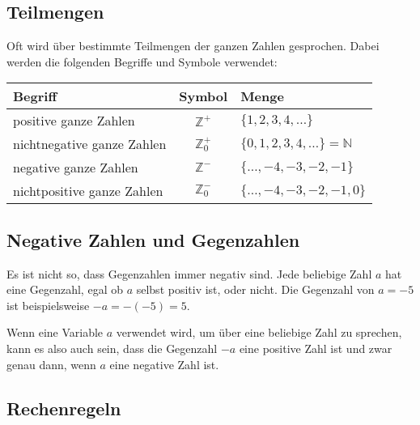 \subsection{Teilmengen}
Oft wird über bestimmte Teilmengen der ganzen Zahlen gesprochen. Dabei werden die folgenden Begriffe und Symbole verwendet:
\begin{center}
  \renewcommand{\arraystretch}{1.3}
  \begin{tabularx}{0.8\textwidth}{Xcl}
      \textbf{Begriff}           & \textbf{Symbol}  & \textbf{Menge} \\
    \toprule
      positive ganze Zahlen      & $\mathbb{Z}^{+}$   & $\{1, 2, 3, 4, \ldots\}$ \\
    \midrule
      nichtnegative ganze Zahlen & $\mathbb{Z}_{0}^{+}$ & $\{0, 1, 2, 3, 4, \ldots\} = \mathbb{N}$ \\
    \midrule
      negative ganze Zahlen      & $\mathbb{Z}^{-}$   & $\{\ldots, -4, -3, -2, -1 \}$ \\
    \midrule
      nichtpositive ganze Zahlen & $\mathbb{Z}_{0}^{-}$ & $\{\ldots, -4, -3, -2, -1, 0 \}$ \\
    \bottomrule
  \end{tabularx}
\end{center}

\subsection{Negative Zahlen und Gegenzahlen}

Es ist nicht so, dass Gegenzahlen immer negativ sind. Jede beliebige Zahl $a$ hat eine Gegenzahl, egal ob $a$ selbst positiv ist, oder nicht. Die Gegenzahl von $a = -5$ ist beispielsweise $-a = -(-5) = 5$.

Wenn eine Variable $a$ verwendet wird, um über eine beliebige Zahl zu sprechen, kann es also auch sein, dass die Gegenzahl $-a$ eine positive Zahl ist und zwar genau dann, wenn $a$ eine negative Zahl ist.

\subsection{Rechenregeln}

